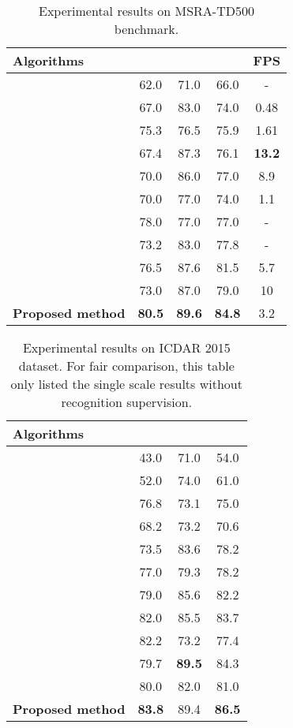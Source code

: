 \documentclass{article}
\begin{document}
\begin{table}[!t]
\centering
\small
\begin{tabular}{lcccc}
  \hline
  Algorithms  &   &  &   & FPS\\
  \hline
  \cite{kang2014orientation} & 62.0 & 71.0 & 66.0 & - \\
  \cite{zhang2016multi} & 67.0 & 83.0 & 74.0 & 0.48 \\
  \cite{yao2016scene} & 75.3 & 76.5 & 75.9 & 1.61 \\
  \cite{zhou2017east} & 67.4 & 87.3 & 76.1 & {\bf 13.2} \\
  \cite{shi2017detecting} & 70.0 & 86.0 & 77.0 & 8.9 \\
  \cite{he2017deep} & 70.0 & 77.0 & 74.0 & 1.1 \\
  \cite{wu2017self} & 78.0 & 77.0 & 77.0 & - \\
  \cite{deng2018pixellink} & 73.2 & 83.0 & 77.8 & - \\
  \cite{lyu2018multi} & 76.5 & 87.6 & 81.5 & 5.7 \\
  \cite{liao2018rotation} & 73.0 & 87.0 & 79.0 & 10 \\
  \hline
  {\bf Proposed method} & {\bf 80.5} & \bf 89.6 & \bf 84.8 & 3.2\\
  \hline
\end{tabular}
\caption{Experimental results on MSRA-TD500 benchmark.}
\label{tab:msra}
\end{table}

\begin{table}[!t]
\centering
\small
\begin{tabular}{lccc}
  \hline
  Algorithms  &   &  &  \\
  \hline
  \cite{zhang2016multi} & 43.0 & 71.0 & 54.0\\
  \cite{tian2016detecting} & 52.0 & 74.0 & 61.0\\
  \cite{shi2017detecting} & 76.8  & 73.1 & 75.0\\
  \cite{liu2017deep} & 68.2 & 73.2 & 70.6\\
  \cite{zhou2017east} & 73.5 & 83.6 & 78.2\\
  \cite{hu2017wordsup} & 77.0 & 79.3 & 78.2\\
  \cite{liao2018rotation} & 79.0 & 85.6 & 82.2\\
  \cite{deng2018pixellink} & 82.0 & 85.5 & 83.7\\
  \cite{ma2018arbitrary} & 82.2 & 73.2 & 77.4\\
  \cite{lyu2018multi} & 79.7 & {\bf 89.5} & 84.3\\
  \cite{he2017deep} & 80.0 & 82.0 & 81.0 \\
  \hline
  {\bf Proposed method} & {\bf 83.8} & 89.4 & {\bf 86.5}\\
  \hline
\end{tabular}
\caption{Experimental results on ICDAR 2015 dataset. For fair comparison, this table only listed the single scale results without recognition supervision.}
\label{tab:ic15}
\end{table}
\end{document}
